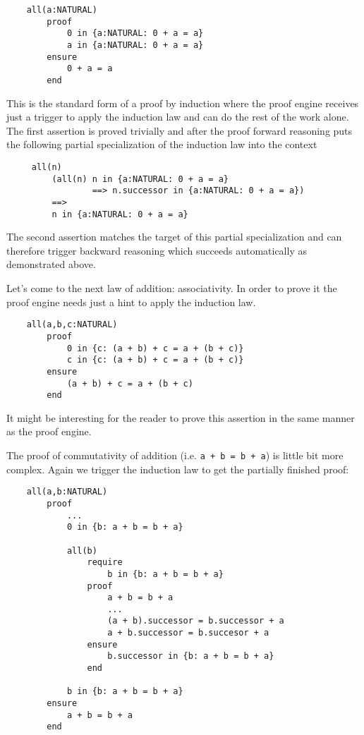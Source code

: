\begin{lstlisting}
    all(a:NATURAL)
        proof
            0 in {a:NATURAL: 0 + a = a}
            a in {a:NATURAL: 0 + a = a}
        ensure
            0 + a = a
        end
\end{lstlisting}

This is the standard form of a proof by induction where the proof engine
receives just a trigger to apply the induction law and can do the rest of the
work alone. The first assertion is proved trivially and after the proof
forward reasoning puts the following partial specialization of the induction
law into the context
\begin{lstlisting}
     all(n)
         (all(n) n in {a:NATURAL: 0 + a = a}
                 ==> n.successor in {a:NATURAL: 0 + a = a})
         ==>
         n in {a:NATURAL: 0 + a = a}
\end{lstlisting}

The second assertion matches the target of this partial specialization and can
therefore trigger backward reasoning which succeeds automatically as
demonstrated above.

Let's come to the next law of addition: associativity. In order to prove it
the proof engine needs just a hint to apply the induction law.

\begin{lstlisting}
    all(a,b,c:NATURAL)
        proof
            0 in {c: (a + b) + c = a + (b + c)}
            c in {c: (a + b) + c = a + (b + c)}
        ensure
            (a + b) + c = a + (b + c)
        end
\end{lstlisting}

It might be interesting for the reader to prove this assertion in the same
manner as the proof engine.


The proof of commutativity of addition (i.e. \lstinline!a + b = b + a!) is
little bit more complex. Again we trigger the induction law to get the
partially finished proof:

\begin{lstlisting}
    all(a,b:NATURAL)
        proof
            ...
            0 in {b: a + b = b + a}

            all(b)
                require
                    b in {b: a + b = b + a}
                proof
                    a + b = b + a
                    ...
                    (a + b).successor = b.successor + a
                    a + b.successor = b.succesor + a
                ensure
                    b.successor in {b: a + b = b + a}
                end

            b in {b: a + b = b + a}
        ensure
            a + b = b + a
        end
\end{lstlisting}

